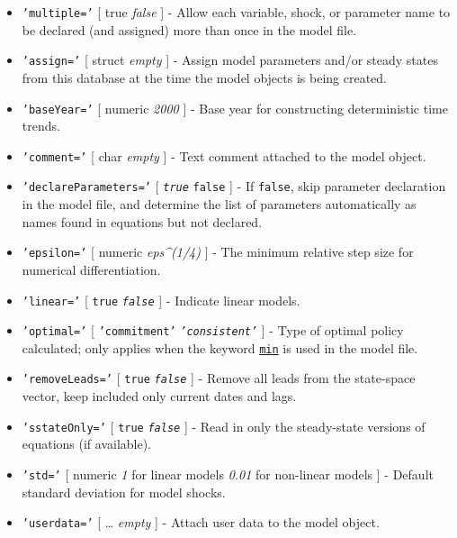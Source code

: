 \begin{itemize}
\item
  \texttt{'multiple='} {[} true \textbar{} \emph{false} {]} - Allow each
  variable, shock, or parameter name to be declared (and assigned) more
  than once in the model file.
\item
  \texttt{'assign='} {[} struct \textbar{} \emph{empty} {]} - Assign
  model parameters and/or steady states from this database at the time
  the model objects is being created.
\item
  \texttt{'baseYear='} {[} numeric \textbar{} \emph{2000} {]} - Base
  year for constructing deterministic time trends.
\item
  \texttt{'comment='} {[} char \textbar{} \emph{empty} {]} - Text
  comment attached to the model object.
\item
  \texttt{'declareParameters='} {[} \emph{\texttt{true}} \textbar{}
  \texttt{false} {]} - If \texttt{false}, skip parameter declaration in
  the model file, and determine the list of parameters automatically as
  names found in equations but not declared.
\item
  \texttt{'epsilon='} {[} numeric \textbar{} \emph{eps\^{}(1/4)} {]} -
  The minimum relative step size for numerical differentiation.
\item
  \texttt{'linear='} {[} \texttt{true} \textbar{} \emph{\texttt{false}}
  {]} - Indicate linear models.
\item
  \texttt{'optimal='} {[} \texttt{'commitment'} \textbar{}
  \emph{\texttt{'consistent'}} {]} - Type of optimal policy calculated;
  only applies when the keyword \href{modellang/min}{\texttt{min}} is
  used in the model file.
\item
  \texttt{'removeLeads='} {[} \texttt{true} \textbar{}
  \emph{\texttt{false}} {]} - Remove all leads from the state-space
  vector, keep included only current dates and lags.
\item
  \texttt{'sstateOnly='} {[} \texttt{true} \textbar{}
  \emph{\texttt{false}} {]} - Read in only the steady-state versions of
  equations (if available).
\item
  \texttt{'std='} {[} numeric \textbar{} \emph{1} for linear models
  \textbar{} \emph{0.01} for non-linear models {]} - Default standard
  deviation for model shocks.
\item
  \texttt{'userdata='} {[} \ldots{} \textbar{} \emph{empty} {]} - Attach
  user data to the model object.
\end{itemize}

